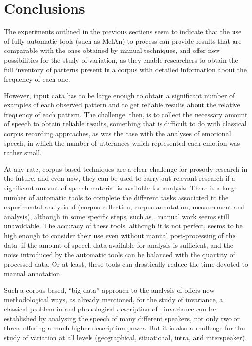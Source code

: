 \documentclass[output=paper]{langsci/langscibook}
\begin{document}
\section{Conclusions}

The experiments outlined in the previous sections seem to indicate that the use of fully automatic tools (such as MelAn) to process  can provide results that are comparable with the ones obtained by manual techniques, and offer new possibilities for the study of  variation, as they enable researchers to obtain the full inventory of  patterns present in a corpus with detailed information about the frequency of each one.

However, input data has to be large enough to obtain a significant number of examples of each observed pattern and to get reliable results about the relative frequency of each pattern. The challenge, then, is to collect the necessary amount of speech to obtain reliable results, something that is difficult to do with classical corpus recording approaches, as was the case with the analyses of emotional speech, in which the number of utterances which represented each emotion was rather small.

At any rate, corpus-based techniques are a clear challenge for prosody research in the future, and even now, they can be used to carry out relevant research if a significant amount of speech material is available for analysis. There is a large number of automatic tools to complete the different tasks associated to the experimental analysis of  (corpus collection, corpus annotation, measurement and analysis), although in some specific steps, such as , manual work seems still unavoidable. The accuracy of these tools, although it is not perfect, seems to be high enough to consider their use even without manual post-processing of the data, if the amount of speech data available for analysis is sufficient, and the noise introduced by the automatic tools can be balanced with the quantity of processed data. Or at least, these tools can drastically reduce the time devoted to manual annotation.

Such a corpus-based, ``big data'' approach to the analysis of  offers new methodological ways, as already mentioned, for the study of  invariance, a classical problem in  and phonological description of :  invariance can be established by analysing the speech of many different speakers, not only two or three, offering a much higher description power. But it is also a challenge for the study of  variation at all levels (geographical, situational, intra, and interspeaker).
\end{document}
